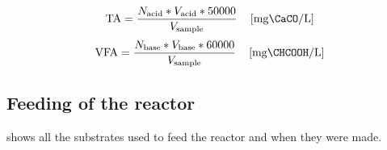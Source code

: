 \documentclass[12pt, a4paper, oneside]{report}
\begin{document}
\begin{equation}
    \mathrm{TA} = \frac{N_\text{acid} * V_\text{acid} * 50000}{V_\text{sample}} \quad \left[\unit{\milli\gram\CaCO\per\litre}\right]
    \label{eq:TA}
\end{equation}
\begin{equation}
    \mathrm{VFA} = \frac{N_\text{base} * V_\text{base} * 60000}{V_\text{sample}} \quad \left[\unit{\milli\gram\CHCOOH\per\litre}\right]
    \label{eq:VFA}
\end{equation}

\subsection{Feeding of the reactor}
\label{subsec:feed_reac}

 shows all the substrates used to feed the reactor and when they were made.
\end{document}
